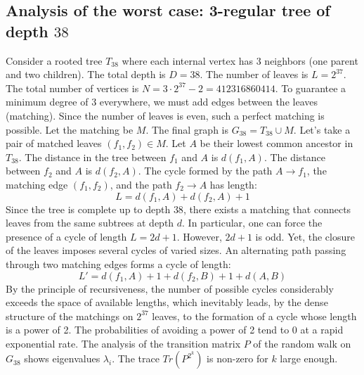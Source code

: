 \documentclass[12pt,a4paper]{article}
\begin{document}
\subsection{Analysis of the worst case: 3-regular tree of depth $38$}
Consider a rooted tree $T_{38}$ where each internal vertex has 3 neighbors (one parent and two children).
The total depth is $D = 38$.
The number of leaves is $L = 2^{37}$.
The total number of vertices is $N = 3 \cdot 2^{37} - 2 = 412316860414$.
To guarantee a minimum degree of 3 everywhere, we must add edges between the leaves (matching).
Since the number of leaves is even, such a perfect matching is possible.
Let the matching be $M$. The final graph is $G_{38} = T_{38} \cup M$.
Let's take a pair of matched leaves $(f_1, f_2) \in M$.
Let $A$ be their lowest common ancestor in $T_{38}$.
The distance in the tree between $f_1$ and $A$ is $d(f_1, A)$.
The distance between $f_2$ and $A$ is $d(f_2, A)$.
The cycle formed by the path $A \to f_1$, the matching edge $(f_1, f_2)$, and the path $f_2 \to A$ has length:
$$ L = d(f_1, A) + d(f_2, A) + 1 $$
Since the tree is complete up to depth $38$, there exists a matching that connects leaves from the same subtrees at depth $d$.
In particular, one can force the presence of a cycle of length $L = 2d + 1$. However, $2d+1$ is odd.
Yet, the closure of the leaves imposes several cycles of varied sizes. An alternating path passing through two matching edges forms a cycle of length:
$$ L' = d(f_1, A) + 1 + d(f_2, B) + 1 + d(A, B) $$
By the principle of recursiveness, the number of possible cycles considerably exceeds the space of available lengths, which inevitably leads, by the dense structure of the matchings on $2^{37}$ leaves, to the formation of a cycle whose length is a power of 2. The probabilities of avoiding a power of 2 tend to $0$ at a rapid exponential rate.
The analysis of the transition matrix $P$ of the random walk on $G_{38}$ shows eigenvalues $\lambda_i$. The trace $Tr(P^{2^k})$ is non-zero for $k$ large enough.
\end{document}
